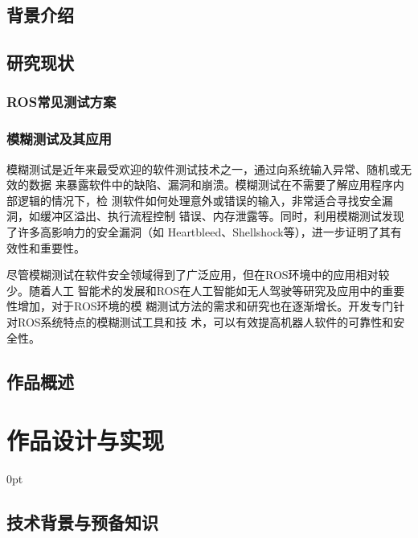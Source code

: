 \documentclass[zihao=-4]{ctexart}
\newcommand{\setParDis}{\setlength {\parskip} {0pt} }
\begin{document}
\begin{spacing}{1.5} %


\subsection{背景介绍} %


\subsection{研究现状}

\subsubsection{ROS常见测试方案}


\subsubsection{模糊测试及其应用}
模糊测试是近年来最受欢迎的软件测试技术之一，通过向系统输入异常、随机或无效的数据
来暴露软件中的缺陷、漏洞和崩溃。模糊测试在不需要了解应用程序内部逻辑的情况下，检
测软件如何处理意外或错误的输入，非常适合寻找安全漏洞，如缓冲区溢出、执行流程控制
错误、内存泄露等。同时，利用模糊测试发现了许多高影响力的安全漏洞（如
Heartbleed、Shellshock等），进一步证明了其有效性和重要性。

尽管模糊测试在软件安全领域得到了广泛应用，但在ROS环境中的应用相对较少。随着人工
智能术的发展和ROS在人工智能如无人驾驶等研究及应用中的重要性增加，对于ROS环境的模
糊测试方法的需求和研究也在逐渐增长。开发专门针对ROS系统特点的模糊测试工具和技
术，可以有效提高机器人软件的可靠性和安全性。

\subsection{作品概述}



\section{作品设计与实现}
\setParDis %

\subsection{技术背景与预备知识} %





\end{spacing}
\end{document}
